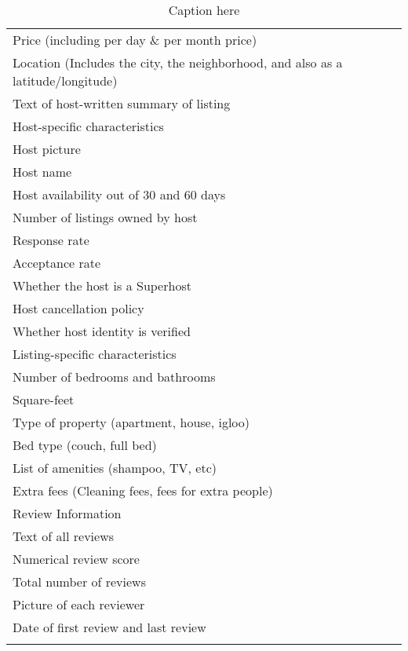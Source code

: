 {
\def\sym#1{\ifmmode^{#1}\else\(^{#1}\)\fi}
\begin{longtable}{l*{1}{c}}
\caption{testing}\\
\hline\hline\endfirsthead\hline\endhead\hline\endfoot\endlastfoot

\hline

Price (including per day \& per month price) \\
[1em]
Location (Includes the city, the neighborhood, and also as a latitude/longitude) \\
[1em]
Text of host-written summary of listing \\
\hline\hline
Host-specific characteristics \\
[1em]
Host picture\\ 
[1em]
Host name\\
[1em]
Host availability out of 30 and 60 days\\
[1em]
Number of listings owned by host\\
[1em]
Response rate\\
[1em]
Acceptance rate\\
[1em]
Whether the host is a Superhost \\
[1em]
Host cancellation policy\\
[1em]
Whether host identity is verified \\

\hline\hline
Listing-specific characteristics \\
\hline
Number of bedrooms and bathrooms \\
[1em]
Square-feet \\
[1em]
Type of property (apartment, house, igloo)\\
[1em]
Bed type (couch, full bed)\\
[1em]
List of amenities (shampoo, TV, etc)\\
[1em]
Extra fees (Cleaning fees, fees for extra people) \\

\hline\hline
Review Information \\
\hline
Text of all reviews \\
[1em]
Numerical review score \\
[1em]
Total number of reviews \\
[1em]
Picture of each reviewer \\
[1em]
Date of first review and last review \\

\hline\hline
\caption*{Caption here}



\end{longtable}
}
